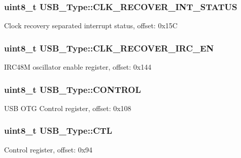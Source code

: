 \subsubsection[{\texorpdfstring{C\+L\+K\+\_\+\+R\+E\+C\+O\+V\+E\+R\+\_\+\+I\+N\+T\+\_\+\+S\+T\+A\+T\+US}{CLK_RECOVER_INT_STATUS}}]{ uint8\+\_\+t U\+S\+B\+\_\+\+Type\+::\+C\+L\+K\+\_\+\+R\+E\+C\+O\+V\+E\+R\+\_\+\+I\+N\+T\+\_\+\+S\+T\+A\+T\+US}\hypertarget{structUSB__Type_a4029c33c535571c3fd55577bc1c37cc4}{}\label{structUSB__Type_a4029c33c535571c3fd55577bc1c37cc4}
Clock recovery separated interrupt status, offset\+: 0x15C 
\subsubsection[{\texorpdfstring{C\+L\+K\+\_\+\+R\+E\+C\+O\+V\+E\+R\+\_\+\+I\+R\+C\+\_\+\+EN}{CLK_RECOVER_IRC_EN}}]{ uint8\+\_\+t U\+S\+B\+\_\+\+Type\+::\+C\+L\+K\+\_\+\+R\+E\+C\+O\+V\+E\+R\+\_\+\+I\+R\+C\+\_\+\+EN}\hypertarget{structUSB__Type_a80fb0714f5079cacf75a9b8d1e8bd4ed}{}\label{structUSB__Type_a80fb0714f5079cacf75a9b8d1e8bd4ed}
I\+R\+C48M oscillator enable register, offset\+: 0x144 
\subsubsection[{\texorpdfstring{C\+O\+N\+T\+R\+OL}{CONTROL}}]{ uint8\+\_\+t U\+S\+B\+\_\+\+Type\+::\+C\+O\+N\+T\+R\+OL}\hypertarget{structUSB__Type_a093d9b4052a399ff21b6694034333f08}{}\label{structUSB__Type_a093d9b4052a399ff21b6694034333f08}
U\+SB O\+TG Control register, offset\+: 0x108 
\subsubsection[{\texorpdfstring{C\+TL}{CTL}}]{ uint8\+\_\+t U\+S\+B\+\_\+\+Type\+::\+C\+TL}\hypertarget{structUSB__Type_ad66155614624c6dbd95f696e1a9f0f35}{}\label{structUSB__Type_ad66155614624c6dbd95f696e1a9f0f35}
Control register, offset\+: 0x94 
